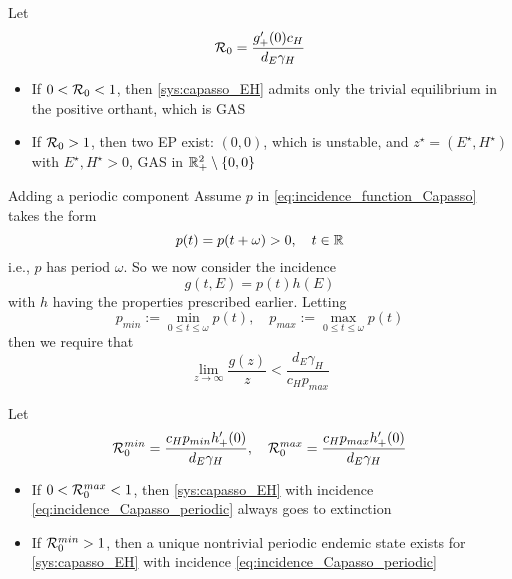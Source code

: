 \documentclass[aspectratio=169]{beamer}
\begin{document}
\begin{frame}
  Let
  \begin{equation}
    \label{eq:R0_capasso}
    \mathcal{R}_0 = \frac{g'_+(0)c_H}{d_E\gamma_H}
  \end{equation}
  \begin{theorem}
    \begin{itemize}
      \item If $0<\mathcal{R}_0<1$, then \eqref{sys:capasso_EH} admits only the trivial equilibrium in the positive orthant, which is GAS
      \item If $\mathcal{R}_0>1$, then two EP exist: $(0,0)$, which is unstable, and $z^\star=(E^\star,H^\star)$ with $E^\star,H^\star>0$, GAS in $\mathbb{R}_+^2\setminus\{0,0\}$
    \end{itemize}
  \end{theorem}
\end{frame}


\begin{frame}{Adding a periodic component}
  Assume $p$ in \eqref{eq:incidence_function_Capasso} takes the form 
  \begin{equation}
    p(t)=p(t+\omega)>0,\quad t\in\mathbb{R}
  \end{equation}
  i.e., $p$ has period $\omega$. So we now consider the incidence
  \begin{equation}
    \label{eq:incidence_Capasso_periodic}
    g(t,E)=p(t)h(E)
  \end{equation}
  with $h$ having the properties prescribed earlier.
  Letting 
  \begin{equation}
    p_{min} := \min_{0\leq t\leq\omega}p(t),\quad
    p_{max} := \max_{0\leq t\leq\omega}p(t)
  \end{equation}
  then we require that 
  \begin{equation}
    \lim_{z\to\infty}\frac{g(z)}{z}<\frac{d_E\gamma_H}{c_Hp_{max}}
  \end{equation}
\end{frame}


\begin{frame}
  Let
  \begin{equation}
    \label{eq:R0_capasso_periodic}
    \mathcal{R}_0^{min} = \frac{c_Hp_{min}h'_+(0)}{d_E\gamma_H},\quad 
    \mathcal{R}_0^{max} = \frac{c_Hp_{max}h'_+(0)}{d_E\gamma_H}
  \end{equation}
  \begin{theorem}
    \begin{itemize}
      \item If $0<\mathcal{R}_0^{max}<1$, then \eqref{sys:capasso_EH} with incidence \eqref{eq:incidence_Capasso_periodic} always goes to extinction
      \item If $\mathcal{R}_0^{min}>1$, then a unique nontrivial periodic endemic state exists for \eqref{sys:capasso_EH} with incidence \eqref{eq:incidence_Capasso_periodic}
    \end{itemize}
  \end{theorem}
\end{frame}
\end{document}
